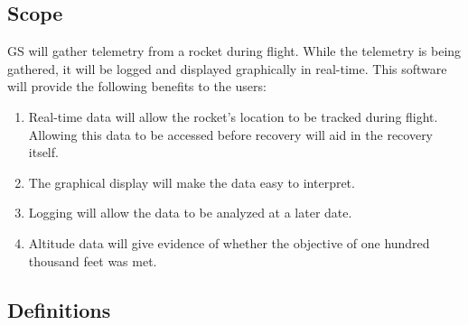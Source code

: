 \documentclass[10pt,draftclsnofoot,onecolumn]{IEEEtran}
\begin{document}
	\subsection{Scope}
	GS will gather telemetry from a rocket during flight.
	While the telemetry is being gathered, it will be logged and displayed graphically in real-time.
	This software will provide the following benefits to the users:
	\begin{enumerate}
		\item Real-time data will allow the rocket's location to be tracked during flight.
		Allowing this data to be accessed before recovery will aid in the recovery itself.
		\item The graphical display will make the data easy to interpret.
		\item Logging will allow the data to be analyzed at a later date.
		\item Altitude data will give evidence of whether the objective of one hundred thousand feet was met.
	\end{enumerate}	
			
	\subsection{Definitions}
	
\end{document}
